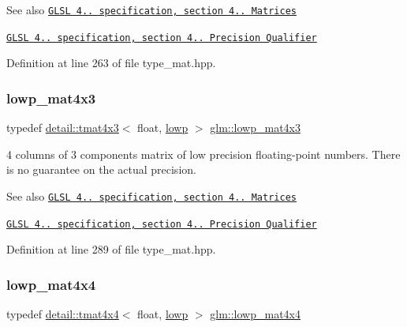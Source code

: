\begin{DoxySeeAlso}{See also}
\href{http://www.opengl.org/registry/doc/GLSLangSpec.4.20.8.pdf}{\tt G\+L\+SL 4.. specification, section 4.. Matrices} 

\href{http://www.opengl.org/registry/doc/GLSLangSpec.4.20.8.pdf}{\tt G\+L\+SL 4.. specification, section 4.. Precision Qualifier} 
\end{DoxySeeAlso}


Definition at line 263 of file type\+\_\+mat.\+hpp.

\mbox{\label{group__core__precision_gada92d0baf15002240dd6f638c57f9fec}} 
\subsubsection{\texorpdfstring{lowp\+\_\+mat4x3}{lowp\_mat4x3}}
{\footnotesize\ttfamily typedef \hyperlink{structglm_1_1detail_1_1tmat4x3}{detail\+::tmat4x3}$<$ float, \hyperlink{namespaceglm_a0f04f086094c747d227af4425893f545ae161af3fc695e696ce3bf69f7332bc2d}{lowp} $>$ \hyperlink{group__core__precision_gada92d0baf15002240dd6f638c57f9fec}{glm\+::lowp\+\_\+mat4x3}}

4 columns of 3 components matrix of low precision floating-\/point numbers. There is no guarantee on the actual precision.

\begin{DoxySeeAlso}{See also}
\href{http://www.opengl.org/registry/doc/GLSLangSpec.4.20.8.pdf}{\tt G\+L\+SL 4.. specification, section 4.. Matrices} 

\href{http://www.opengl.org/registry/doc/GLSLangSpec.4.20.8.pdf}{\tt G\+L\+SL 4.. specification, section 4.. Precision Qualifier} 
\end{DoxySeeAlso}


Definition at line 289 of file type\+\_\+mat.\+hpp.

\mbox{\label{group__core__precision_gad31846a0565c22a0479950313c28b218}} 
\subsubsection{\texorpdfstring{lowp\+\_\+mat4x4}{lowp\_mat4x4}}
{\footnotesize\ttfamily typedef \hyperlink{structglm_1_1detail_1_1tmat4x4}{detail\+::tmat4x4}$<$ float, \hyperlink{namespaceglm_a0f04f086094c747d227af4425893f545ae161af3fc695e696ce3bf69f7332bc2d}{lowp} $>$ \hyperlink{group__core__precision_gad31846a0565c22a0479950313c28b218}{glm\+::lowp\+\_\+mat4x4}}

